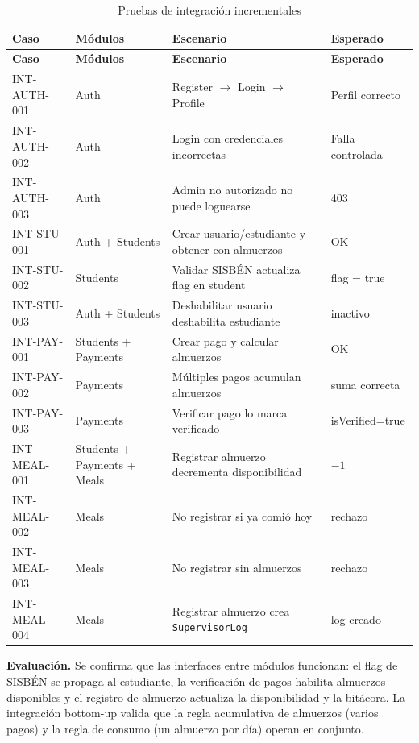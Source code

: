 \documentclass[stu,11pt,floatsintext]{apa7}
\begin{document}
\begin{longtable}{l L{0.30\textwidth} L{0.34\textwidth} L{0.16\textwidth}}
\caption{Pruebas de integración incrementales}\label{tab:incremental}\\
\toprule
\textbf{Caso} & \textbf{Módulos} & \textbf{Escenario} & \textbf{Esperado} \\
\midrule
\endfirsthead
\toprule
\textbf{Caso} & \textbf{Módulos} & \textbf{Escenario} & \textbf{Esperado} \\
\midrule
\endhead
\bottomrule
\endlastfoot
INT-AUTH-001 & Auth & Register $\rightarrow$ Login $\rightarrow$ Profile & Perfil correcto \\
INT-AUTH-002 & Auth & Login con credenciales incorrectas & Falla controlada \\
INT-AUTH-003 & Auth & Admin no autorizado no puede loguearse & 403 \\
INT-STU-001 & Auth + Students & Crear usuario/estudiante y obtener con almuerzos & OK \\
INT-STU-002 & Students & Validar SISBÉN actualiza flag en student & flag = true \\
INT-STU-003 & Auth + Students & Deshabilitar usuario deshabilita estudiante & inactivo \\
INT-PAY-001 & Students + Payments & Crear pago y calcular almuerzos & OK \\
INT-PAY-002 & Payments & Múltiples pagos acumulan almuerzos & suma correcta \\
INT-PAY-003 & Payments & Verificar pago lo marca verificado & isVerified=true \\
INT-MEAL-001 & Students + Payments + Meals & Registrar almuerzo decrementa disponibilidad & $-1$ \\
INT-MEAL-002 & Meals & No registrar si ya comió hoy & rechazo \\
INT-MEAL-003 & Meals & No registrar sin almuerzos & rechazo \\
INT-MEAL-004 & Meals & Registrar almuerzo crea \texttt{SupervisorLog} & log creado \\
\end{longtable}

\noindent\textbf{Evaluación.} Se confirma que las interfaces entre módulos funcionan: el
flag de SISBÉN se propaga al estudiante, la verificación de pagos habilita almuerzos
disponibles y el registro de almuerzo actualiza la disponibilidad y la bitácora. La
integración bottom-up valida que la regla acumulativa de almuerzos (varios pagos) y la
regla de consumo (un almuerzo por día) operan en conjunto.
\end{document}
